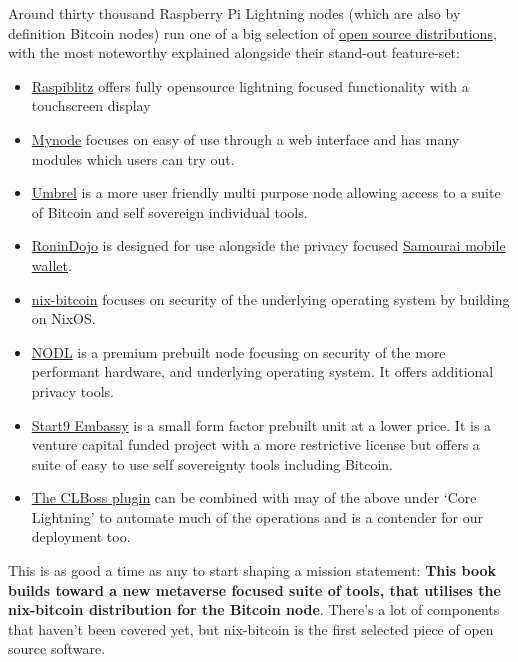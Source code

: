 Around thirty thousand Raspberry Pi Lightning nodes (which are also by definition Bitcoin nodes) run one of a big selection of \href{https://github.com/bavarianledger/bitcoin-nodes}{open source distributions}, with the most noteworthy explained alongside their stand-out feature-set:
\begin{itemize}
\item \href{https://github.com/rootzoll/raspiblitz}{Raspiblitz} offers fully opensource lightning focused functionality with a touchscreen display
\item \href{https://github.com/mynodebtc/mynode}{Mynode} focuses on easy of use through a web interface and has many modules which users can try out.
\item \href{https://github.com/getumbrel/umbrel-os}{Umbrel} is a more user friendly multi purpose node allowing access to a suite of Bitcoin and self sovereign individual tools.
\item \href{https://wiki.ronindojo.io/}{RoninDojo} is designed for use alongside the privacy focused \href{https://samouraiwallet.com/}{Samourai mobile wallet}.
\item \href{https://github.com/fort-nix/nix-bitcoin}{nix-bitcoin} focuses on security of the underlying operating system by building on NixOS.
\item \href{https://nodl.it}{NODL} is a premium prebuilt node focusing on security of the more performant hardware, and underlying operating system. It offers additional privacy tools.
\item \href{https://store.start9labs.com/collections/embassy}{Start9 Embassy} is a small form factor prebuilt unit at a lower price. It is a venture capital funded project with a more restrictive license but offers a suite of easy to use self sovereignty tools including Bitcoin. 
\item \href{https://www.osinteditor.com/NXN/mp_march28_f3/index.html}{The CLBoss plugin} can be combined with may of the above under `Core Lightning' to automate much of the operations and is a contender for our deployment too.
\end{itemize}
This is as good a time as any to start shaping a mission statement: \textbf{This book builds toward a new metaverse focused suite of tools, that utilises the nix-bitcoin distribution for the Bitcoin node}. There's a lot of components that haven't been covered yet, but nix-bitcoin is the first selected piece of open source software.

